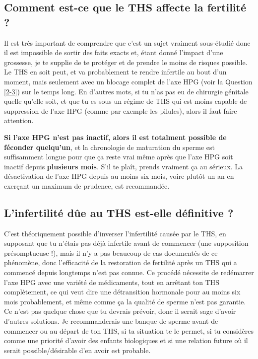 \documentclass{article}
\begin{document}
\subsection{Comment est-ce que le THS affecte la fertilité ?}\label{11-42}

Il est très important de comprendre que c'est un sujet vraiment sous-étudié donc il est impossible de sortir des faits exacts et, étant donné l'impact d'une grossesse, je te supplie de te protéger et de prendre le moins de risques possible. Le THS en soit peut, et va probablement te rendre infertile au bout d'un moment, mais seulement avec un blocage complet de l'axe HPG (voir la Question \ref{2-3}) sur le temps long. En d'autres mots, si tu n'as pas eu de chirurgie génitale quelle qu'elle soit, et que tu es sous un régime de THS qui est moins capable de suppression de l'axe HPG (comme par exemple les pilules), alors il faut faire attention.

\textbf{Si l'axe HPG n'est pas inactif, alors il est totalment possible de féconder quelqu'un}, et la chronologie de maturation du sperme est suffisamment longue pour que ça reste vrai même après que l'axe HPG soit inactif depuis \textbf{plusieurs mois}. S'il te plaît, prends vraiment ça au sérieux. La désactivation de l'axe HPG depuis au moins six mois, voire plutôt un an en exerçant un maximum de prudence, est recommandée.

\subsection{L'infertilité dûe au THS est-elle définitive ?}\label{11-43}

C'est théoriquement possible d'inverser l'infertilité causée par le THS, en supposant que tu n'étais pas déjà infertile avant de commencer (une supposition présomptueuse !), mais il n'y a pas beaucoup de cas documentés de ce phénomène, donc l'efficacité de la restoration de fertilité après un THS qui a commencé depuis longtemps n'est pas connue. Ce procédé nécessite de redémarrer l'axe HPG avec une variété de médicaments, tout en arrêtant ton THS complètement, ce qui veut dire une détransition hormonale pour au moins six mois probablement, et même comme ça la qualité de sperme n'est pas garantie. Ce n'est pas quelque chose que tu devrais prévoir, donc il serait sage d'avoir d'autres solutions. Je recommanderais une banque de sperme avant de commencer ou au départ de ton THS, si ta situation te le permet, si tu considères comme une priorité d'avoir des enfants biologiques et si une relation future où il serait possible/désirable d'en avoir est probable.
\end{document}
